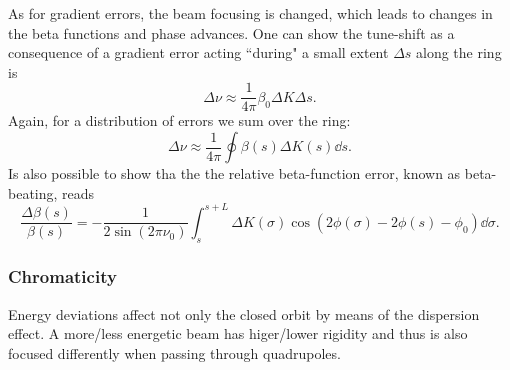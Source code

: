     As for gradient errors, the beam focusing is changed, which leads to changes in the beta functions and phase advances. One can show the tune-shift as a consequence of a gradient error acting ``during" a small extent $\Delta s$ along the ring is \cite{lee_accelerator_2004}
         \begin{equation}
        \Delta \nu \approx \frac{1}{4\pi} \beta_0 \Delta K \Delta s.
        \label{eq:delta_nu}
     \end{equation}
     Again, for a distribution of errors we sum over the ring:
     \begin{equation}
        \Delta \nu \approx \frac{1}{4\pi}\oint \beta(s) \Delta K(s) \dd s.
        \label{eq:delta_nu_dist}
    \end{equation}
    Is also possible to show tha the the relative beta-function error, known as beta-beating, reads
     \begin{equation}
        \frac{\Delta \beta(s)}{\beta(s)} = - \frac{1}{2\sin(2\pi\nu_0)}\int_{s}^{s+L}\Delta K(\sigma)\cos(2\phi(\sigma)-2\phi(s)-\phi_0)\dd\sigma.
        \label{eq:beta_beat}
     \end{equation}
\subsubsection{Chromaticity}
Energy deviations affect not only the closed orbit by means of the dispersion effect. A more/less energetic beam has higer/lower rigidity and thus is also focused differently when passing through quadrupoles.

